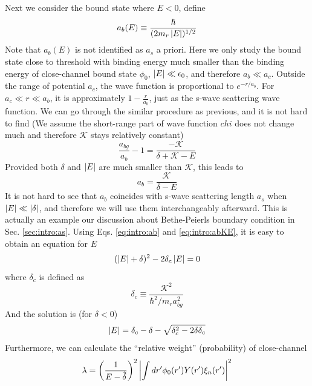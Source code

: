 Next we consider the bound state where $E<0$, define
\begin{equation}\label{eq:intro:ab}
a_{b}(E)\equiv\frac{\hbar}{(2m_{r}\left\lvert{E}\right\rvert)^{1/2}}
\end{equation}
Note that $a_{b}(E)$ is not identified as $a_{s}$ a priori.  Here we only study the bound state close to threshold with binding energy much smaller than the binding energy of close-channel bound state $\phi_{0}$, $\left\lvert{E}\right\rvert\ll\epsilon_{0}$, and therefore $a_{b}\ll{a_{c}}$.  Outside the range of potential $a_{c}$,  the wave function is proportional to $e^{-r/a_{b}}$. For $a_{c}\ll{}r\ll{}a_{b}$, it is approximately $1-\frac{r}{a_{b}}$, just as the s-wave scattering wave function.  We can go through the similar procedure as previous, and it is not hard to find (We assume the short-range part of wave function $chi$ does not change much and therefore $\mathcal{K}$ stays relatively constant)
\begin{equation}
\frac{a_{bg}}{a_{b}}-1=\frac{-\mathcal{K}}{\delta+\mathcal{K}-E}
\end{equation}
Provided both $\delta$ and $\left\lvert{E}\right\rvert$ are much smaller than $\mathcal{K}$, this leads to 
\begin{equation}\label{eq:intro:abKE}
a_{b}=\frac{\mathcal{K}}{\delta-E}
\end{equation}
It is not hard to see that $a_{b}$ coincides with s-wave scattering length $a_{s}$ when $\left\lvert{E}\right\rvert\ll\left\lvert{\delta}\right\rvert$, and therefore we will use them interchangeably afterward. This is actually an example our discussion about Bethe-Peierls boundary condition in Sec. \ref{sec:intro:as}.  Using Eqs. \ref{eq:intro:ab} and \ref{eq:intro:abKE}, it is easy to obtain an equation for $E$
\begin{equation}
(\left\lvert{E}\right\rvert+\delta)^{2}-2\delta_{c}\left\lvert{E}\right\rvert=0
\end{equation}
where $\delta_{c}$ is defined as 
\begin{equation}
\delta_{c}\equiv\frac{\mathcal{K}^{2}}{\hbar^{2}/m_{r}a_{bg}^{2}}
\end{equation}
And the solution is  (for $\delta<0$)
\begin{equation}
\left\lvert{E}\right\rvert=\delta_{c}-\delta-\sqrt{\delta_{c}^{2}-2\delta\delta_{c}}
\end{equation}
Furthermore, we can calculate the ``relative weight'' (probability) of close-channel 
\begin{equation}
\lambda=\left(\frac{1}{E-\tilde\delta}\right)^{2}\left\lvert{\int{}dr'\phi_{0}(r')Y(r')\xi_{n}(r')}\right\rvert^{2}
\end{equation}
